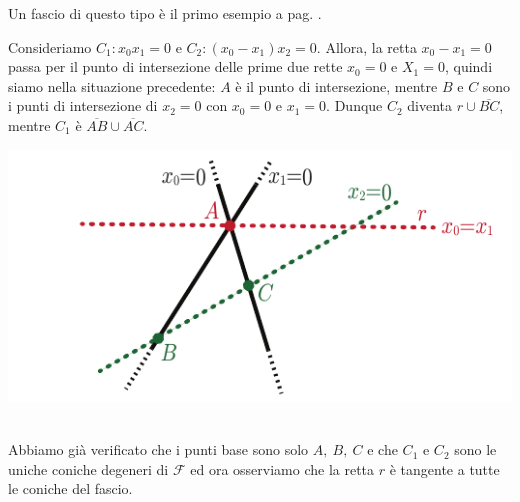 \begin{observe}
	Un fascio di questo tipo è il primo esempio a pag. \pageref{esempi lez 35}.\\
	\begin{minipage}{0.72\textwidth}
	Consideriamo $C_1\colon x_0x_1=0$ e $C_2\colon (x_0-x_1)x_2=0$. Allora, la retta $x_0-x_1=0$ passa per il punto di intersezione delle prime due rette $x_0=0$ e $X_1=0$, quindi siamo nella situazione precedente: $A$ è il punto di intersezione, mentre $B$ e $C$ sono i punti di intersezione di $x_2=0$ con $x_0=0$ e $x_1=0$. Dunque $C_2$ diventa $r\cup \overline{BC}$, mentre $C_1$ è $\overline{AB}\cup \overline{AC}$.
	\end{minipage}
	\hspace{-5mm}
	\begin{minipage}{0.27\textwidth}
		\includegraphics[trim=0cm 0cm 0cm 0cm,clip,scale=0.50]{images/fourpointconic3.pdf}
	\end{minipage}\\
Abbiamo già verificato che i punti base sono solo $A,\ B,\ C$ e che $C_1$ e $C_2$ sono le uniche coniche degeneri di $\mathcal{F}$ ed ora osserviamo che la retta $r$ è tangente a tutte le coniche del fascio.
\end{observe}
